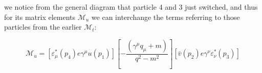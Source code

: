 \documentclass[11pt]{article}
\theoremstyle{definition}
\begin{document}
we notice from the general diagram that particle 4 and 3 just switched, and thus for its matrix elements $\mathcal{M}_u$ we can interchange the terms referring to those particles from the earlier $\mathcal{M}_t$:

\begin{equation}
    \boxed{
        \mathcal{M}_u = 
        \left[
            \varepsilon^{*}_{\mu}(p_4)e\gamma^{\mu}u(p_1)
        \right]
        \left[
            -\frac{(\gamma^{\mu} q_{\mu} + m)}{q^2-m^2}
        \right]
        \left[
            \bar{v}(p_2)e\gamma^{\nu}\varepsilon^{*}_{\nu}(p_3)
        \right]
    }
    \end{equation}



\end{document}
